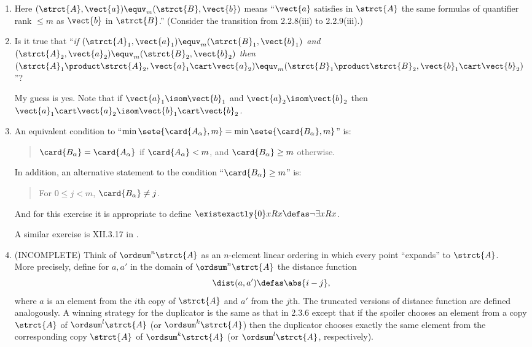 \begin{enumerate}[1.]
%
\item {} Here $(\strct{A}, \vect{a}) \equv_m (\strct{B}, \vect{b})$ means ``$\vect{a}$ satisfies in $\strct{A}$ the same formulas of quantifier rank $\leq m$ as $\vect{b}$ in $\strct{B}$.'' (Consider the transition from 2.2.8(iii) to 2.2.9(iii).)
%
\item {} Is it true that ``\emph{if $(\strct{A}_1, \vect{a}_1) \equv_m (\strct{B}_1, \vect{b}_1)$ and $(\strct{A}_2, \vect{a}_2) \equv_m (\strct{B}_2, \vect{b}_2)$ then $(\strct{A}_1 \product \strct{A}_2, \vect{a}_1 \cart \vect{a}_2) \equv_m (\strct{B}_1 \product \strct{B}_2, \vect{b}_1 \cart \vect{b}_2)$}''?

My guess is yes. Note that if $\vect{a}_1 \isom \vect{b}_1$ and $\vect{a}_2 \isom \vect{b}_2$ then $\vect{a}_1 \cart \vect{a}_2 \isom \vect{b}_1 \cart \vect{b}_2$.
%
\item {} An equivalent condition to ``$\min\sete{\card{A_\alpha}, m} = \min\sete{\card{B_\alpha}, m}$'' is:
\begin{quote}
$\card{B_\alpha} = \card{A_\alpha}$ if $\card{A_\alpha} < m$, and $\card{B_\alpha} \geq m$ otherwise.
\end{quote}
In addition, an alternative statement to the condition ``$\card{B_\alpha} \geq m$'' is:
\begin{quote}
For $0 \leq j < m$, $\card{B_\alpha} \neq j$.
\end{quote}
And for this exercise it is appropriate to define $\existexactly{0}x Rx \defas \neg\exists x Rx$.
\begin{remark}
A similar exercise is XII.3.17 in \cite{EFT}.
\end{remark}
%
\item {} (INCOMPLETE)
Think of $\ordsum^n \strct{A}$ as an $n$-element linear ordering in which every point ``expands'' to $\strct{A}$.\\
\newpar
More precisely, define for $a, a'$ in the domain of $\ordsum^n \strct{A}$ the distance function
\[
\dist(a, a') \defas \abs{i - j},
\]
where $a$ is an element from the $i$th copy of $\strct{A}$ and $a'$ from the $j$th. The truncated versions of distance function are defined analogously. A winning strategy for the duplicator is the same as that in 2.3.6 except that if the spoiler chooses an element from a copy $\strct{A}$ of $\ordsum^l \strct{A}$ (or $\ordsum^k \strct{A}$) then the duplicator chooses exactly the same element from the corresponding copy $\strct{A}$ of $\ordsum^k \strct{A}$ (or $\ordsum^l \strct{A}$, respectively).

\end{enumerate}
